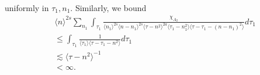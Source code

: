 \documentclass[12pt,reqno]{amsart}
\numberwithin{equation}{section}  %
\begin{document}
%
uniformly in $\tau_{1}, n_{1}$. 
%
Similarly, we bound
%
%
\begin{equation}
\begin{split}
  & \langle n
    \rangle ^{2s}
    \sum_{n_{1}} \int_{\tau_{1}} \frac{\chi_{A_{2}}}{\langle n_{1} \rangle ^{2s}
    \langle n-n_{1} \rangle ^{2s} 
    \langle \tau - n^{2} \rangle^{2a} 
    \langle \tau_{1} - n_{1}^{2} \rangle \langle  \tau - \tau_{1} -
    (n - n_{1})^{2} \rangle}
    d \tau_1 
    \\
  & \le 
  \int_{\tau_{1}} \frac{1}{\langle \tau_{1} \rangle  \langle \tau -
  \tau_{1} - n^{2} \rangle}
d \tau_1 
\\
  & \lesssim   \langle \tau - n^{2} \rangle ^{-1} 
  \\
  & < \infty.
	\end{split}
\end{equation}
%
\end{document}

